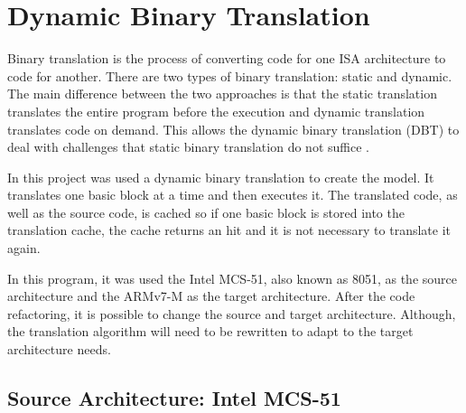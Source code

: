 \documentclass{report}
\begin{document}
	\section{Dynamic Binary Translation}
	\par Binary translation is the process of converting code for one ISA architecture to code for another. There are two types of binary translation: static and dynamic. The main difference between the two approaches is that the static translation translates the entire program before the execution and dynamic translation translates code on demand. This allows the dynamic binary translation (DBT) to deal with challenges that static binary translation do not suffice \cite{b.hawkingsb.demskyd.brueningq.zhao2015}. 
	\par In this project was used a dynamic binary translation to create the model. It translates one basic block at a time and then executes it. The translated code, as well as the source code, is cached so if one basic block is stored into the translation cache, the cache returns an hit and it is not necessary to translate it again. 
	\par In this program, it was used the Intel MCS-51, also known as 8051, as the source architecture and the ARMv7-M as the target architecture. After the code refactoring, it is possible to change the source and target architecture. Although, the translation algorithm will need to be rewritten to adapt to the target architecture needs.
	
		\subsection{Source Architecture: Intel MCS-51}
		
\end{document}
